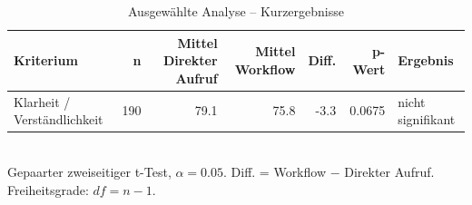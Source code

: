 \begin{table}[htbp]
\centering
\caption{Ausgewählte Analyse -- Kurzergebnisse}
\begin{tabular}{lrrrrrl}
\toprule
Kriterium & n & Mittel Direkter Aufruf & Mittel Workflow & Diff. & p-Wert & Ergebnis \\
\midrule
Klarheit / Verständlichkeit & 190 & 79.1 & 75.8 & -3.3 & 0.0675 & nicht signifikant \\
\bottomrule
\end{tabular}
\\[2mm]
\footnotesize Gepaarter zweiseitiger t-Test, $\alpha=0.05$. Diff. = Workflow $-$ Direkter Aufruf. Freiheitsgrade: $df=n-1$.
\end{table}
